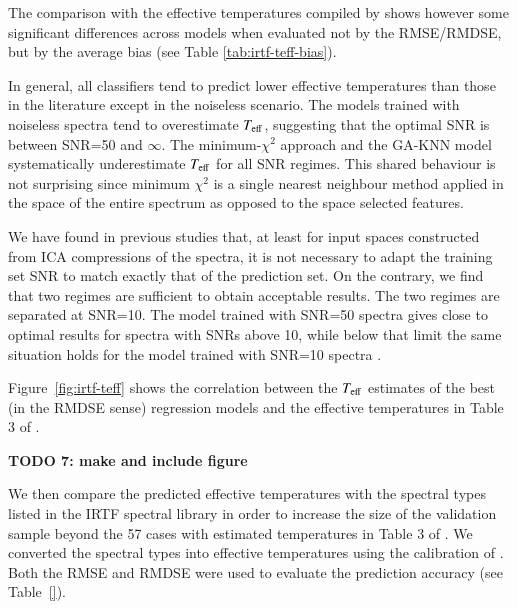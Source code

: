 The comparison with the effective temperatures compiled by
\cite{cesetti} shows however some significant differences across
models when evaluated not by the RMSE/RMDSE, but by the average bias
(see Table \ref{tab:irtf-teff-bias}). 

In general, all classifiers tend to predict lower effective
temperatures than those in the literature except in the noiseless
scenario. The models trained with noiseless spectra tend to
overestimate $T_{\rm eff}$, suggesting that the optimal SNR is between
SNR=50 and $\infty$. The minimum-$\chi^2$ approach and the GA-KNN
model systematically underestimate $T_{\rm eff}$ for all SNR
regimes. This shared behaviour is not surprising since minimum
$\chi^2$ is a single nearest neighbour method applied in the space of
the entire spectrum as opposed to the space selected features.

We have found in previous studies that, at least for input spaces
constructed from ICA compressions of the spectra, it is not necessary
to adapt the training set SNR to match exactly that of the prediction
set. On the contrary, we find that two regimes are sufficient to
obtain acceptable results. The two regimes are separated at
SNR=10. The model trained with SNR=50 spectra gives close to optimal
results for spectra with SNRs above 10, while below that limit the
same situation holds for the model trained with SNR=10
spectra \cite{PaperAna}.


Figure~\ref{fig:irtf-teff} shows the correlation between the $T_{\rm
eff}$ estimates of the best (in the RMDSE sense) regression models and
the effective temperatures in Table 3 of \cite{cesetti}. 

{\bf TODO 7: make and include figure}

 

We then compare the predicted effective temperatures with the spectral
types listed in the IRTF spectral library in order to increase the
size of the validation sample beyond the 57 cases with estimated
temperatures in Table 3 of \cite{cesetti}. We converted the spectral
types into effective temperatures using the calibration of
\cite{2009ApJ...702..154S}. Both the RMSE and RMDSE were used to
evaluate the prediction accuracy (see Table~\ref{}).


